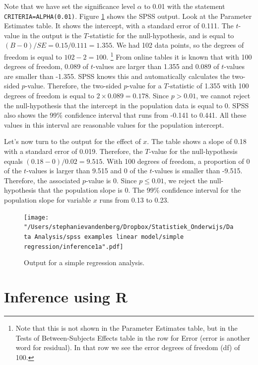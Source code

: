 \documentclass[]{book}\usepackage[]{graphicx}\usepackage[]{color}
\begin{document}
Note that we have set the significance level $\alpha$ to 0.01 with the statement \texttt{CRITERIA=ALPHA(0.01)}. Figure \ref{fig:inf_29} shows the SPSS output. Look at the Parameter Estimates table. It shows the intercept, with a standard error of 0.111. The $t$-value in the output is the $T$-statistic for the null-hypothesis, and is equal to $(B-0)/SE=0.15/0.111=1.355$. We had 102 data points, so the degrees of freedom is equal to $102-2=100$. \footnote{Note that this is not shown in the Parameter Estimates table, but in the Tests of Between-Subjects Effects table in the row for Error (error is another word for residual). In that row we see the error degrees of freedom (df) of 100.} From online tables it is known that with 100 degrees of freedom, 0.089 of $t$-values are larger than 1.355 and 0.089 of $t$-values are smaller than -1.355. SPSS knows this and automatically calculates the two-sided $p$-value. Therefore, the two-sided $p$-value for a $T$-statistic of 1.355 with 100 degrees of freedom is equal to $2 \times 0.089 = 0.178$. Since $p > 0.01$, we cannot reject the null-hypothesis that the intercept in the population data is equal to 0. SPSS also shows the 99\% confidence interval that runs from -0.141 to 0.441. All these values in this interval are reasonable values for the population intercept.

Let's now turn to the output for the effect of $x$. The table shows a slope of 0.18 with a standard error of 0.019. Therefore, the $T$-value for the null-hypothesis equals $(0.18-0)/0.02=9.515$. With 100 degrees of freedom, a proportion of 0 of the $t$-values is larger than 9.515 and 0 of the $t$-values is smaller than -9.515. Therefore, the associated $p$-value is 0. Since $p \leq 0.01$, we reject the null-hypothesis that the population slope is 0. The 99\% confidence interval for the population slope for variable $x$ runs from 0.13 to 0.23.

\begin{figure}[h!]
    \begin{center}
       \texttt{[image: "/Users/stephanievandenberg/Dropbox/Statistiek\_Onderwijs/Data Analysis/spss examples linear model/simple regression/inference1a".pdf]}
    \end{center}
    \caption{Output for a simple regression analysis.}
    \label{fig:inf_29}
\end{figure}


\section{Inference using R}
\end{document}
